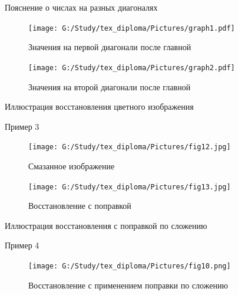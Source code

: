 \documentclass[10pt]{beamer}
\begin{document}
\begin{frame}{Пояснение о числах на разных диагоналях}

\begin{block}{}
\begin{minipage}{50mm}
    \begin{figure}[H]
            \texttt{[image: G:/Study/tex\_diploma/Pictures/graph1.pdf]}
            \label{Graph1}
            \caption[Значения на первой диагонали после главной]{Значения на первой диагонали после главной}
        \end{figure}
\end{minipage}
\hfill
\begin{minipage}{50mm}
  \begin{figure}[H]
            \texttt{[image: G:/Study/tex\_diploma/Pictures/graph2.pdf]}
            \label{Graph2}
            \caption[Значения на второй диагонали после главной]{Значения на второй диагонали после главной}
        \end{figure}
\end{minipage}
\hfill
\end{block}

\end{frame}


\begin{frame}{Иллюстрация восстановления цветного изображения}

\begin{block}{Пример 3}
\hspace*{-\parindent}
\begin{minipage}{53mm}
    \begin{figure}[H]
            \texttt{[image: G:/Study/tex\_diploma/Pictures/fig12.jpg]}
            \label{Pic12}
            \caption[Смазанное изображение]{Смазанное изображение}
        \end{figure}
\end{minipage}
\begin{minipage}{50mm}
    \begin{figure}[H]
            \texttt{[image: G:/Study/tex\_diploma/Pictures/fig13.jpg]}
            \label{Pic13}
            \caption[Восстановление с поправкой]{Восстановление с поправкой}
        \end{figure}
\end{minipage}
\end{block}
\end{frame}

\begin{frame}{Иллюстрация восстановления с поправкой по сложению}

\begin{block}{Пример 4}
\begin{minipage}{100mm}
  \begin{figure}[H]
            \texttt{[image: G:/Study/tex\_diploma/Pictures/fig10.png]}
            \label{Pic10}
            \caption[Восстановление с применением поправки по сложению]{Восстановление с применением поправки по сложению}
        \end{figure}
\end{minipage}
\hfill
\end{block}
\end{frame}
\end{document}
